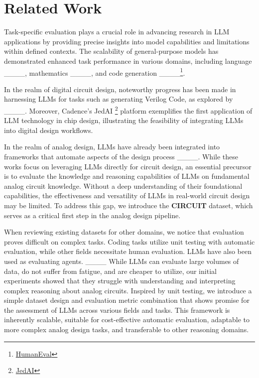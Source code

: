 \section{Related Work}
Task-specific evaluation plays a crucial role in advancing research in LLM applications by providing precise insights into model capabilities and limitations within defined contexts.
The scalability of general-purpose models has demonstrated enhanced task performance in various domains, including language ____, mathematics ____, and code generation ____\footnote{\href{https://paperswithcode.com/sota/code-generation-on-humaneval}{HumanEval}}. 

In the realm of digital circuit design, noteworthy progress has been made in harnessing LLMs for tasks such as generating Verilog Code, as explored by ____. Moreover, Cadence's JedAI \footnote{\href{https://community.cadence.com/cadence_blogs_8/b/corporate/posts/cadence-creates-industry-s-first-llm-technology-for-chip-design}{JedAI}} platform exemplifies the first application of LLM technology in chip design, illustrating the feasibility of integrating LLMs into digital design workflows.

In the realm of analog design, LLMs have already been integrated into frameworks that automate aspects of the design process ____. While these works focus on leveraging LLMs directly for circuit design, an essential precursor is to evaluate the knowledge and reasoning capabilities of LLMs on fundamental analog circuit knowledge. Without a deep understanding of their foundational capabilities, the effectiveness and versatility of LLMs in real-world circuit design may be limited. To address this gap, we introduce the \textbf{CIRCUIT} dataset, which serves as a critical first step in the analog design pipeline.

When reviewing existing datasets for other domains, we notice that evaluation proves difficult on complex tasks. Coding tasks utilize unit testing with automatic evaluation, while other fields necessitate human evaluation. LLMs have also been used as evaluating agents. ____ While LLMs can evaluate large volumes of data, do not suffer from fatigue, and are cheaper to utilize, our initial experiments showed that they struggle with understanding and interpreting complex reasoning about analog circuits.
Inspired by unit testing, we introduce a simple dataset design and evaluation metric combination that shows promise for the assessment of LLMs across various fields and tasks. This framework is inherently scalable, suitable for cost-effective automatic evaluation, adaptable to more complex analog design tasks, and transferable to other reasoning domains.


